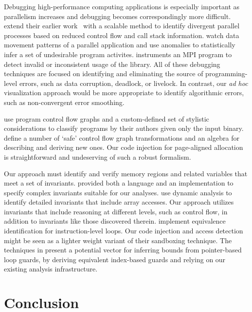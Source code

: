 Debugging high-performance computing applications is especially important as
parallelism increases and debugging becomes correspondingly more difficult.
\cite{Laguna:2011:Debugging} extend their earlier
work~\cite{Bronevetsky:2010:AutomaDeD} with a scalable method to
identify divergent parallel processes based on reduced control flow and
call stack information. \cite{Gao:2007:DMTracker} watch data movement
patterns of a parallel application and use anomalies to statistically
infer a set of undesirable program activites.
\cite{Luecke:2003:MPICheck} instruments an MPI program to detect
invalid or inconsistent usage of the library.  All of these debugging
techniques are focused on identifying and eliminating the source of
programming-level errors, such as data corruption, deadlock, or
livelock.  In contrast, our \textit{ad hoc} visualization approach
would be more appropriate to identify algorithmic errors, such as
non-convergent error smoothing.

\cite{Rosenblum:2011:Authors} use program control flow graphs and a
custom-defined set of stylistic considerations to classify programs by
their authors given only the input binary.
\cite{Bernat:2012:BinEdit} define a number of `safe' control flow graph
transformations and an algebra for describing and deriving new ones.
Our code injection for page-aligned allocation is straightforward and
undeserving of such a robust formalism.

Our approach must identify and verify memory regions and related
variables that meet a set of invariants. \cite{McCloskey:2010:Infer}
provided both a language and an implementation to specify complex
invariants suitable for our analyses.
\cite{Nguyen:2012:Invariants} use dynamic analysis to identify detailed
invariants that include array accesses.  Our approach utilizes
invariants that include reasoning at different levels, such as control
flow, in addition to invariants like those discovered therein.
\cite{Sharma:2013:DDEC} implement equivalence identification for
instruction-level loops.  Our code injection and access detection might
be seen as a lighter weight variant of their sandboxing technique.  The
techniques in \cite{Sharma:2013:DDEC} present a potential vector
for inferring bounds from pointer-based loop guards, by deriving
equivalent index-based guards and relying on our existing analysis
infrastructure.

\section{Conclusion}

